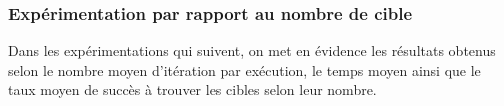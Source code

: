 

\subsubsection{Expérimentation par rapport au nombre de cible}
Dans les expérimentations qui suivent, on met en évidence les résultats obtenus selon le nombre moyen d'itération par exécution, le temps moyen ainsi que le taux moyen de succès à trouver les cibles selon leur nombre.

%		

